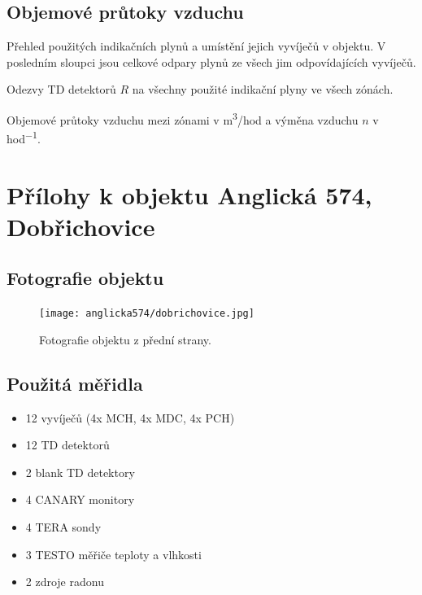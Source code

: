 \section{Objemové průtoky vzduchu}

\begin{table}[H]
    \centering
    \caption{Přehled použitých indikačních plynů a umístění jejich vyvíječů v objektu. V posledním sloupci jsou celkové odpary plynů ze všech jim odpovídajících vyvíječů.}
    \label{tab:halkova980_indikacniPlyny}
    
\end{table}
\begin{table}[H]
    \centering
    \caption{Odezvy TD detektorů $R$ na všechny použité indikační plyny ve všech zónách.}
    \label{tab:halkova980_odezvyTD}
    
\end{table}

\begin{table}[H]
    \centering
    \caption{Objemové průtoky vzduchu mezi zónami v \si{m^3/hod} a výměna vzduchu $n$ v \si{hod^{-1}}.}
    \label{tab:halkova980_prutoky}
    
\end{table}

\chapter{Přílohy k objektu Anglická 574, Dobřichovice}\label{navesti:priloha_anglicka574}

\section{Fotografie objektu}
\begin{figure}[ht]
    \centering
    \texttt{[image: anglicka574/dobrichovice.jpg]}
    \caption{Fotografie objektu z přední strany.}
    \label{fig:anglicka574_fotografie}
\end{figure}


\section{Použitá měřidla}
\begin{itemize}
    \setlength\itemsep{0em}
	\item 12 vyvíječů (4x MCH, 4x MDC, 4x PCH)
	\item 12 TD detektorů
	\item 2 blank TD detektory 
	\item 4 CANARY monitory
	\item 4 TERA sondy
	\item 3 TESTO měřiče teploty a vlhkosti
	\item 2 zdroje radonu
\end{itemize}

